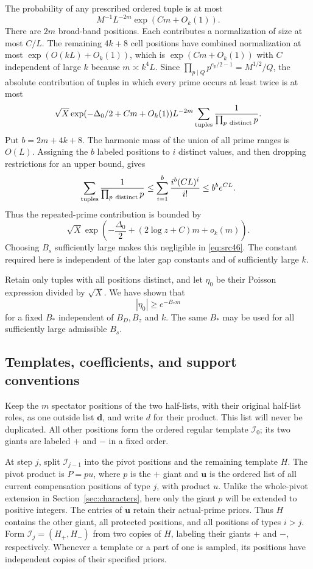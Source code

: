The probability of any prescribed ordered tuple is at most
\[
            M^{-1}L^{-2m}\exp(Cm+O_k(1)).
\]
There are $2m$ broad-band positions.  Each contributes a
normalization of size at most $C/L$.  The remaining $4k+8$ cell
positions have combined normalization at most $\exp(O(kL)+O_k(1))$,
which is $\exp(Cm+O_k(1))$ with $C$ independent of large $k$ because
$m\asymp k^4L$.  Since
$\prod_{p\mid Q}p^{e_p/2-1}=M^{1/2}/Q$, the absolute contribution
of tuples in which every prime occurs at least twice is at most
\[
 \sqrt X\exp(-\Delta_0/2+Cm+O_k(1))L^{-2m}
               \sum_{\rm tuples}\frac1{\prod_{p\ \text{distinct}}p}.
\]
Put $b=2m+4k+8$.  The harmonic mass of the union of all prime ranges
is $O(L)$.  Assigning the $b$ labeled positions to $i$ distinct
values, and then dropping restrictions for an upper bound, gives
\[
 \sum_{\rm tuples}\frac1{\prod_{p\ \text{distinct}}p}
    \le \sum_{i=1}^{b}\frac{i^b(CL)^i}{i!}
    \le b^b e^{CL}.
\]
Thus the repeated-prime contribution is bounded by
\[
 \sqrt X\exp\left(-\frac{\Delta_0}{2}
                +(2\log z+C)m+o_k(m)\right).
\]
Choosing $B_s$ sufficiently large makes this negligible in
\eqref{eq:src46}.  The constant required here is independent of the
later gap constants and of sufficiently large $k$.

Retain only tuples with all positions distinct, and let $\eta_0$ be
their Poisson expression divided by $\sqrt X$.  We have shown that
\begin{equation}
                        |\eta_0|\ge e^{-B_*m}
 \label{eq:src47}
\end{equation}
for a fixed $B_*$ independent of $B_D,B_z$ and $k$.  The same
$B_*$ may be used for all sufficiently large admissible $B_s$.

\subsection{Templates, coefficients, and support conventions}
\label{subsec:coefficient-support}

Keep the $m$ spectator positions of the two half-lists, with their
original half-list roles, as one outside list $\mathbf d$, and write
$d$ for their product.  This list will never be duplicated.  All
other positions form the ordered regular template $\mathcal I_0$;
its two giants are labeled $+$ and $-$ in a fixed order.

At step $j$, split $\mathcal I_{j-1}$ into the pivot positions and
the remaining template $H$.  The pivot product is $P=pu$, where
$p$ is the $+$ giant and $\mathbf u$ is the ordered list of all
current compensation positions of type $j$, with product $u$.
Unlike the whole-pivot extension in Section~\ref{sec:characters},
here only the giant $p$ will be extended to positive integers.
The entries of $\mathbf u$ retain their actual-prime priors.
Thus $H$ contains the other giant, all protected positions, and all
positions of types $i>j$.  Form
$\mathcal I_j=(H_+,H_-)$ from two copies of $H$, labeling their
giants $+$ and $-$, respectively.  Whenever a template or a part of
one is sampled, its positions have independent copies of their
specified priors.

